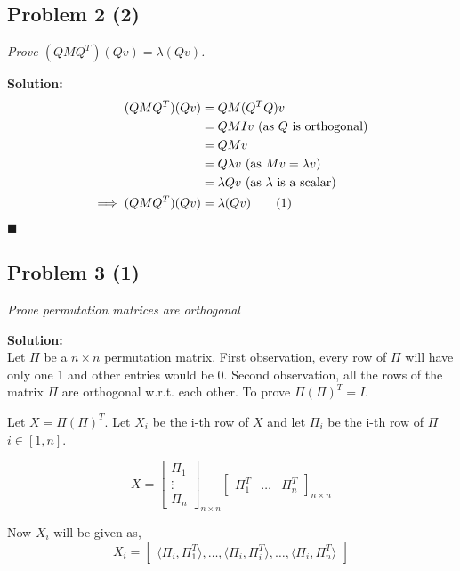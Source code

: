 \documentclass[12pt,a4paper]{article}
\newcommand\numberthis{\addtocounter{equation}{1}\tag{\theequation}}
\newcommand{\rightqed}{
\begin{flushright}
$\blacksquare$
\end{flushright}
}
\newcommand{\solution}{\noindent\textbf{Solution:}\\}
\begin{document}
\subsection*{Problem 2 (2)}
\textit{
    Prove $(QMQ^T)(Qv) = \lambda (Qv)$.
}

\solution
\begin{align*}
    (QMQ^T)(Qv) &= QM(Q^TQ)v \\
                &= QMIv \text{ (as $Q$ is orthogonal)} \\
                &= QMv \\
                &= Q\lambda v \text{ (as $Mv=\lambda v$)} \\
                &= \lambda Qv \text{ (as $\lambda$ is a scalar)} \\
    \implies (QMQ^T)(Qv) &= \lambda (Qv) \numberthis
\end{align*}
\rightqed

\newpage
\subsection*{Problem 3 (1)}
\textit{
    Prove permutation matrices are orthogonal
}

\solution

Let $\Pi$ be a $n \times n$ permutation matrix. First observation, every row of $\Pi$ will have only one 1 and other entries would be 0. Second observation, all the rows of the matrix $\Pi$ are orthogonal w.r.t. each other. To prove $\Pi (\Pi)^T = I$.

Let $X = \Pi(\Pi)^T$. Let $X_i$ be the i-th row of $X$ and let $\Pi_i$ be the i-th row of $\Pi$ $i \in [1,n]$.

\begin{equation}
    X = \begin{bmatrix}
        \Pi_1 \\ \vdots \\ \Pi_n
    \end{bmatrix}_{n \times n}
    \begin{bmatrix}
        \Pi_1^T & \hdots & \Pi_n^T
    \end{bmatrix}_{n \times n}
\end{equation}

Now $X_i$ will be given as,
\begin{equation}
    X_i =
    \begin{bmatrix}
        \langle \Pi_i, \Pi_1^T \rangle, \hdots, \langle \Pi_i, \Pi_i^T \rangle, \hdots, \langle \Pi_i, \Pi_n^T \rangle
    \end{bmatrix} \label{eq:2_1}
\end{equation}
\end{document}
